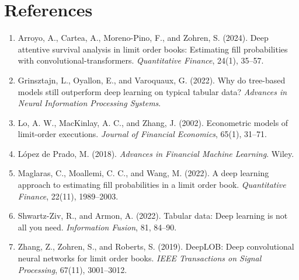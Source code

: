 \documentclass[11pt]{article}
\begin{document}
\section*{References}
\begin{enumerate}[label={},leftmargin=0pt,itemsep=0.45em,parsep=0pt]
\item Arroyo, A., Cartea, A., Moreno-Pino, F., and Zohren, S. (2024). Deep attentive survival analysis in limit order books: Estimating fill probabilities with convolutional-transformers. \emph{Quantitative Finance}, 24(1), 35--57.
\item Grinsztajn, L., Oyallon, E., and Varoquaux, G. (2022). Why do tree-based models still outperform deep learning on typical tabular data? \emph{Advances in Neural Information Processing Systems}.
\item Lo, A. W., MacKinlay, A. C., and Zhang, J. (2002). Econometric models of limit-order executions. \emph{Journal of Financial Economics}, 65(1), 31--71.
\item López de Prado, M. (2018). \emph{Advances in Financial Machine Learning}. Wiley.
\item Maglaras, C., Moallemi, C. C., and Wang, M. (2022). A deep learning approach to estimating fill probabilities in a limit order book. \emph{Quantitative Finance}, 22(11), 1989--2003.
\item Shwartz-Ziv, R., and Armon, A. (2022). Tabular data: Deep learning is not all you need. \emph{Information Fusion}, 81, 84--90.
\item Zhang, Z., Zohren, S., and Roberts, S. (2019). DeepLOB: Deep convolutional neural networks for limit order books. \emph{IEEE Transactions on Signal Processing}, 67(11), 3001--3012.
\end{enumerate}
\end{document}
